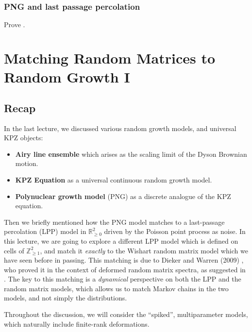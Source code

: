 \documentclass[letterpaper,11pt,oneside,reqno]{book}
\numberwithin{equation}{chapter}  %
\theoremstyle{definition}
\begin{document}
\subsection{PNG and last passage percolation}
\label{lecture12:prob:PNG_LPP}

Prove .













\chapter{Matching Random Matrices to Random Growth I}
\label{chap:lecture13}



\section{Recap}

In the last lecture, we discussed various random growth models, and universal KPZ objects:
\begin{itemize}
	\item \textbf{Airy line ensemble} which arises as the scaling limit of the Dyson Brownian motion.
	\item \textbf{KPZ Equation} as a universal continuous random growth model.
	\item \textbf{Polynuclear growth model} (PNG) as a discrete analogue of the KPZ equation.
\end{itemize}

Then we briefly mentioned how the PNG model matches to a
last-passage percolation (LPP) model in
$\mathbb{R}^2_{\ge0}$ driven by the Poisson
point process as noise.
In this lecture, we are going to explore a different
LPP model which is defined on cells of $\mathbb{Z}_{\ge1}^{2}$, and
match it \emph{exactly} to the Wishart random matrix model which we have seen before in passing.
This matching is due to Dieker and Warren (2009)
\cite{dieker2008largest}, who proved it
in the context
of deformed random matrix spectra,
as suggested in
\cite{BorodinPeche2009}.
The key to this matching is a \emph{dynamical} perspective
on both the LPP and the random matrix models, which allows us to
match Markov chains in the two models, and not simply the distributions.

Throughout the discussion, we will consider the ``spiked'', multiparameter models,
which naturally include finite-rank deformations.
\end{document}
